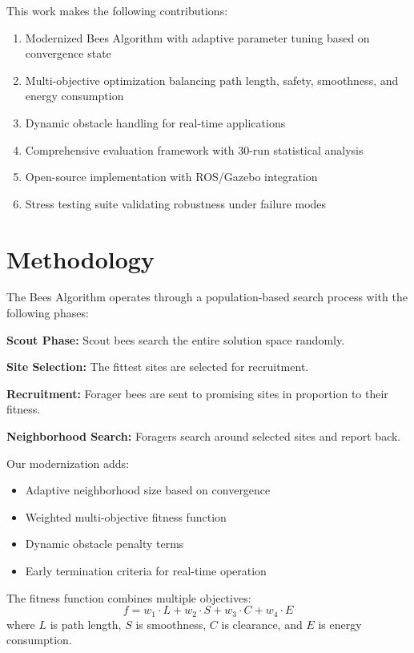 \documentclass[12pt]{article}
\begin{document}
This work makes the following contributions:
\begin{enumerate}
    \item Modernized Bees Algorithm with adaptive parameter tuning based on convergence state
    \item Multi-objective optimization balancing path length, safety, smoothness, and energy consumption
    \item Dynamic obstacle handling for real-time applications
    \item Comprehensive evaluation framework with 30-run statistical analysis
    \item Open-source implementation with ROS/Gazebo integration
    \item Stress testing suite validating robustness under failure modes
\end{enumerate}

\section{Methodology}

The Bees Algorithm operates through a population-based search process with the following phases:

\textbf{Scout Phase:} Scout bees search the entire solution space randomly.

\textbf{Site Selection:} The fittest sites are selected for recruitment.

\textbf{Recruitment:} Forager bees are sent to promising sites in proportion to their fitness.

\textbf{Neighborhood Search:} Foragers search around selected sites and report back.

Our modernization adds:
\begin{itemize}
    \item Adaptive neighborhood size based on convergence
    \item Weighted multi-objective fitness function
    \item Dynamic obstacle penalty terms
    \item Early termination criteria for real-time operation
\end{itemize}

The fitness function combines multiple objectives:
\begin{equation}
    f = w_1 \cdot L + w_2 \cdot S + w_3 \cdot C + w_4 \cdot E
\end{equation}
where $L$ is path length, $S$ is smoothness, $C$ is clearance, and $E$ is energy consumption.
\end{document}
